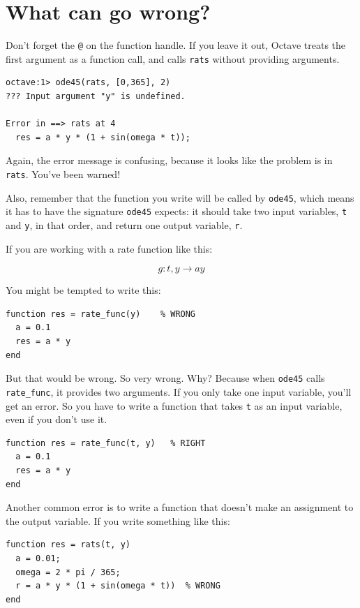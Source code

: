 \documentclass{book}
\begin{document}
\section{What can go wrong?}

Don't forget the {\tt @} on the function handle.
If you leave it out, Octave treats the first argument as a function
call, and calls {\tt rats} without providing arguments.

\begin{verbatim}
octave:1> ode45(rats, [0,365], 2)
??? Input argument "y" is undefined.

Error in ==> rats at 4
  res = a * y * (1 + sin(omega * t));
\end{verbatim}

Again, the error message is confusing, because it looks like the problem
is in {\tt rats}. You've been warned!

Also, remember that the function you write will be called by
{\tt ode45}, which means it has to have the signature {\tt ode45}
expects: it should take two input variables, {\tt t} and {\tt y},
in that order, and return one output variable, {\tt r}.

If you are working with a rate function like this:

\[ g : t, y \to a y \]

You might be tempted to write this:

\begin{verbatim}
function res = rate_func(y)    % WRONG
  a = 0.1
  res = a * y
end
\end{verbatim}

But that would be wrong. So very wrong. Why? Because
when {\tt ode45} calls {\tt rate\_func}, it provides two arguments.
If you only take one input variable, you'll get an error. So
you have to write a function that takes {\tt t} as an input
variable, even if you don't use it.

\begin{verbatim}
function res = rate_func(t, y)   % RIGHT
  a = 0.1
  res = a * y
end
\end{verbatim}

Another common error is to write a function that doesn't make
an assignment to the output variable. If you write something
like this:

\begin{verbatim}
function res = rats(t, y)
  a = 0.01;
  omega = 2 * pi / 365;
  r = a * y * (1 + sin(omega * t))  % WRONG
end
\end{verbatim}
\end{document}
